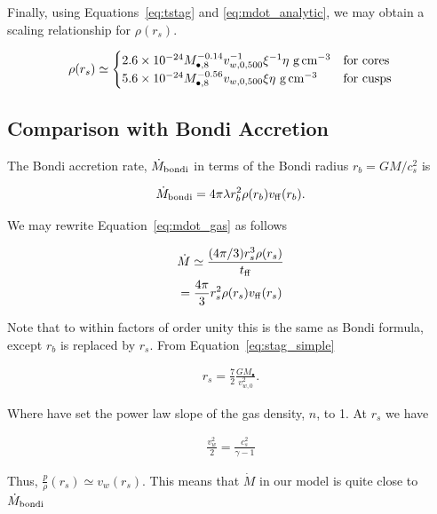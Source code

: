 \documentclass[usenatbib,fleqn]{mn2e}
\newcommand{\Mdotb}{\dot{M}_{\rm bondi}}
\newcommand{\rs}{r_s}
\newcommand{\rb}{r_b}
\newcommand{\vw}{v_w}
\newcommand{\kew}{\frac{v_w^2}{2}}
\newcommand{\cs}{\frac{p}{\rho}}
\newcommand{\Mbh}[1][]{M_{\bullet#1}}
\newcommand{\Mbheight}{M_{\bullet,8}}
\newcommand{\ff}{\rm ff}
\newcommand{\vwO}{v_{w,0}}
\newcommand{\vwOFH}{v_{w,0,500}}
\begin{document}
Finally, using Equations~\ref{eq:tstag} and \ref{eq:mdot_analytic}, we
may obtain a scaling relationship for $\rho(\rs)$. 

\begin{align}
  \rho(\rs)\simeq
  \begin{cases}
    2.6 \times 10^{-24} \Mbheight^{-0.14} \vwOFH^{-1} \xi^{-1} \eta \,
    \, {\rm g \, cm^{-3}}& \text{for cores}\\
    5.6 \times 10^{-24}  \Mbheight^{-0.56} \vwOFH  \xi  \eta \,\, {\rm g \,cm^{-3}} & \text{for cusps}
  \end{cases}
  \label{eq:rhors}
\end{align}


\subsection{Comparison with Bondi Accretion}
The Bondi accretion rate, $\Mdotb$ in terms of the Bondi radius $\rb=G
M/c_s^2$ is 

\begin{align}
  \Mdotb=4\pi \lambda r_b^2 \rho(r_b) v_{\rm ff}(r_b).
\end{align}

We may rewrite Equation~\ref{eq:mdot_gas} as follows

\begin{align}
  &\dot{M}\simeq\frac{(4 \pi/3) \rs^3 \rho(\rs)}{t_{\ff}}\\
  &=\frac{4 \pi}{3} \rs^2 \rho(\rs) v_{\ff}(\rs)
\end{align}

Note that to within factors of order unity this is the same as Bondi formula, except $\rb$ is replaced by $\rs$. 
From Equation~\ref{eq:stag_simple}

\begin{align}
  \rs=\frac{7}{2}\frac{G \Mbh}{\vwO^2}.
  \label{eq:rs_simple}
\end{align}

Where have set the power law slope of the gas density, $n$, to 1.  At $\rs$ we have

\begin{align}
  \kew=\frac{c_s^2}{\gamma-1}
\end{align}

Thus, $\cs(\rs)\simeq \vw(\rs)$. This means that $\dot{M}$ in our model is quite close to $\Mdotb$


\end{document}
